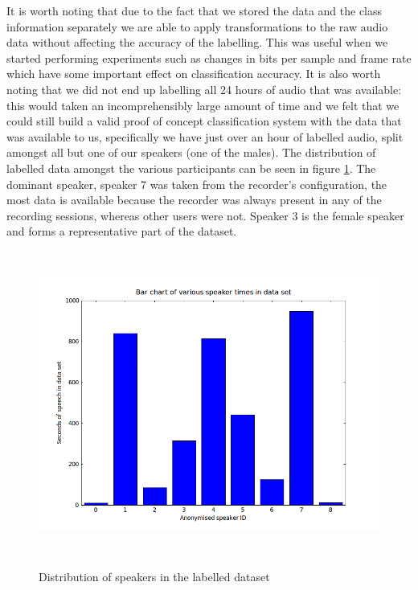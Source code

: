 \documentclass[ %
                    author={Sam Phippen},
                supervisor={Dr. Rafal Bogacz},
                     title={Real time voice activity detectors in noisy personal computing environments},
                  subtitle={},
                    degree={MEng},
                      year={2012} ]{thesis}
\begin{document}
It is worth noting that due to the fact that we stored the data and the class
information separately we are able to apply transformations to the raw audio
data without affecting the accuracy of the labelling. This was useful when we
started performing experiments such as changes in bits per sample and frame
rate which have some important effect on classification accuracy. It is also
worth noting that we did not end up labelling all 24 hours of audio that was
available: this would taken an incomprehensibly large amount of time and we
felt that we could still build a valid proof of concept classification system
with the data that was available to us, specifically we have just over an hour
of labelled audio, split amongst all but one of our speakers (one of the
males). The distribution of labelled data amongst the various participants can
be seen in figure \ref{img:speaker_distribution}. The dominant speaker, speaker
7 was taken from the recorder's configuration, the most data is available
because the recorder was always present in any of the recording sessions,
whereas other users were not. Speaker 3 is the female speaker and forms a
representative part of the dataset.

\begin{figure}
    \includegraphics[height=10cm]{speaker.png}
    \label{img:speaker_distribution}
    \caption{Distribution of speakers in the labelled dataset}
\end{figure}
\end{document}
